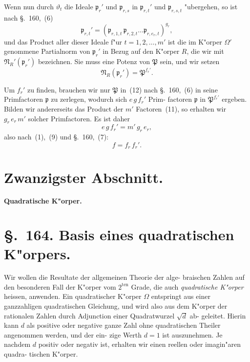 \documentclass[12pt,a4paper]{article}
\theoremstyle{weber}
\begin{document}
Wenn nun durch $\vartheta_t$ die Ideale $\mathfrak{p}_r'$ und $\mathfrak{p}_{r,s}$ in $\mathfrak{p}_{r,t}'$ und $\mathfrak{p}_{r,s,t}$
"ubergehen, so ist nach \S.~160,~(6)
\begin{equation}\label{eq:s163-11}
\mathfrak{p}_{r,t}' = (\mathfrak{p}_{r,1,t}\,\mathfrak{p}_{r,2,t}\dots\mathfrak{p}_{r,e_r,t})^{g_r},
\end{equation}
und das Product aller dieser Ideale f"ur $t = 1, 2, \dots, m'$ ist die
im K"orper $\varOmega'$ genommene Partialnorm von $\mathfrak{p}_r'$ in Bezug auf den
K"orper $R$, die wir mit $\mathfrak{N}_R'(\mathfrak{p}_r')$ bezeichnen. Sie muss eine Potenz
von $\mathfrak{P}$ sein, und wir setzen
\begin{equation}\label{eq:s163-12}
\mathfrak{N}_R(\mathfrak{p}_r') = \mathfrak{P}^{f_r'}.
\end{equation}

Um $f_r'$ zu finden, brauchen wir nur $\mathfrak{P}$ in~(12) nach \S.~160,~(6)
in seine Primfactoren $\mathfrak{p}$ zu zerlegen, wodurch sich $e\,g\,f_r'$ Prim-
factoren $\mathfrak{p}$ in $\mathfrak{P}^{f_r'}$ ergeben. Bilden wir andererseits das Product
 der $m'$ Factoren~(11), so erhalten wir $g_r\,e_r\,m'$ solcher Primfactoren.
Es ist daher
\[
e\,g\,f_r' = m'\,g_r\,e_r,
\]
also nach~(1),~(9) und \S.~160,~(7):
\begin{equation}\label{eq:s163-13}
f = f_r\,f_r'.
\end{equation}

\newpage
\section*{Zwanzigster Abschnitt.}

\begin{center}
\Large\bfseries
Quadratische K"orper.
\end{center}
\bigskip

\section*{\S.~164. Basis eines quadratischen K"orpers.}

Wir wollen die Resultate der allgemeinen Theorie der alge-
braischen Zahlen auf den besonderen Fall der K"orper vom $2^{\mathrm{ten}}$
Grade, die auch \emph{quadratische K"orper} heissen, anwenden. Ein
quadratischer K"orper $\varOmega$ entspringt aus einer ganzzahligen
quadratischen Gleichung, und wird also aus dem K"orper der
rationalen Zahlen durch Adjunction einer Quadratwurzel $\sqrt{d}$ ab-
geleitet. Hierin kann $d$ als positive oder negative ganze Zahl
ohne quadratischen Theiler angenommen werden, und der ein-
zige Werth $d = 1$ ist auszunehmen. Je nachdem $d$ positiv oder
negativ ist, erhalten wir einen reellen oder imagin"aren quadra-
tischen K"orper.
\end{document}
